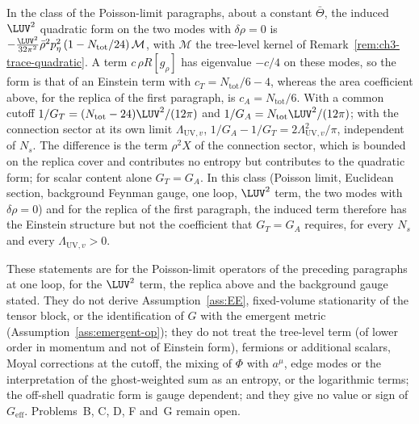 In the class of the Poisson-limit paragraphs, about a constant \(\bar\Theta\), the induced \(\LUV^2\) quadratic form on the two modes with \(\delta\rho=0\) is \(-\tfrac{\LUV^2}{32\pi^2}\bar\rho^{2}p_\eta^2\,(1-N_{\mathrm{tot}}/24)\,\mathcal M\), with \(\mathcal M\) the tree-level kernel of Remark~\ref{rem:ch3-trace-quadratic}. A term \(c\,\rho R[g_\rho]\) has eigenvalue \(-c/4\) on these modes, so the form is that of an Einstein term with \(c_T=N_{\mathrm{tot}}/6-4\), whereas the area coefficient above, for the replica of the first paragraph, is \(c_A=N_{\mathrm{tot}}/6\). With a common cutoff \(1/G_T=(N_{\mathrm{tot}}-24)\LUV^2/(12\pi)\) and \(1/G_A=N_{\mathrm{tot}}\LUV^2/(12\pi)\); with the connection sector at its own limit \(\Lambda_{\mathrm{UV},v}\), \(1/G_A-1/G_T=2\Lambda_{\mathrm{UV},v}^2/\pi\), independent of \(N_s\). The difference is the term \(\rho^2X\) of the connection sector, which is bounded on the replica cover and contributes no entropy but contributes to the quadratic form; for scalar content alone \(G_T=G_A\). In this class (Poisson limit, Euclidean section, background Feynman gauge, one loop, \(\LUV^2\) term, the two modes with \(\delta\rho=0\)) and for the replica of the first paragraph, the induced term therefore has the Einstein structure but not the coefficient that \(G_T=G_A\) requires, for every \(N_s\) and every \(\Lambda_{\mathrm{UV},v}>0\).

These statements are for the Poisson-limit operators of the preceding paragraphs at one loop, for the \(\LUV^2\) term, the replica above and the background gauge stated. They do not derive Assumption~\ref{ass:EE}, fixed-volume stationarity of the tensor block, or the identification of \(G\) with the emergent metric (Assumption~\ref{ass:emergent-op}); they do not treat the tree-level term (of lower order in momentum and not of Einstein form), fermions or additional scalars, Moyal corrections at the cutoff, the mixing of \(\Phi\) with \(a^\mu\), edge modes or the interpretation of the ghost-weighted sum as an entropy, or the logarithmic terms; the off-shell quadratic form is gauge dependent; and they give no value or sign of \(G_{\mathrm{eff}}\). Problems~B, C, D, F and~G remain open.

